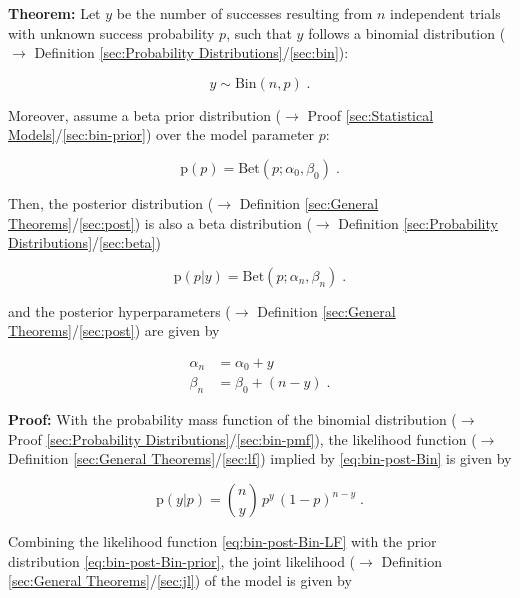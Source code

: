 \documentclass[a4paper,12pt,twoside]{book}
\begin{document}
\textbf{Theorem:} Let $y$ be the number of successes resulting from $n$ independent trials with unknown success probability $p$, such that $y$ follows a binomial distribution ($\rightarrow$ Definition \ref{sec:Probability Distributions}/\ref{sec:bin}):

\begin{equation} \label{eq:bin-post-Bin}
y \sim \mathrm{Bin}(n,p) \; .
\end{equation}

Moreover, assume a beta prior distribution ($\rightarrow$ Proof \ref{sec:Statistical Models}/\ref{sec:bin-prior}) over the model parameter $p$:

\begin{equation} \label{eq:bin-post-Bin-prior}
\mathrm{p}(p) = \mathrm{Bet}(p; \alpha_0, \beta_0) \; .
\end{equation}

Then, the posterior distribution ($\rightarrow$ Definition \ref{sec:General Theorems}/\ref{sec:post}) is also a beta distribution ($\rightarrow$ Definition \ref{sec:Probability Distributions}/\ref{sec:beta})

\begin{equation} \label{eq:bin-post-Bin-post}
\mathrm{p}(p|y) = \mathrm{Bet}(p; \alpha_n, \beta_n) \; .
\end{equation}

and the posterior hyperparameters ($\rightarrow$ Definition \ref{sec:General Theorems}/\ref{sec:post}) are given by

\begin{equation} \label{eq:bin-post-Bin-post-par}
\begin{split}
\alpha_n &= \alpha_0 + y \\
\beta_n &= \beta_0 + (n-y) \; .
\end{split}
\end{equation}


\vspace{1em}
\textbf{Proof:} With the probability mass function of the binomial distribution ($\rightarrow$ Proof \ref{sec:Probability Distributions}/\ref{sec:bin-pmf}), the likelihood function ($\rightarrow$ Definition \ref{sec:General Theorems}/\ref{sec:lf}) implied by \eqref{eq:bin-post-Bin} is given by

\begin{equation} \label{eq:bin-post-Bin-LF}
\mathrm{p}(y|p) = {n \choose y} \, p^y \, (1-p)^{n-y} \; .
\end{equation}

Combining the likelihood function \eqref{eq:bin-post-Bin-LF} with the prior distribution \eqref{eq:bin-post-Bin-prior}, the joint likelihood ($\rightarrow$ Definition \ref{sec:General Theorems}/\ref{sec:jl}) of the model is given by
\end{document}
